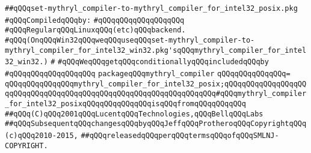 \label{src/lib/core/compiler/set-mythryl_compiler-to-mythryl_compiler_for_intel32_posix.pkg}
\verb|##qQQqset-mythryl_compiler-to-mythryl_compiler_for_intel32_posix.pkg|\newline
\newline
\verb|#qQQqCompiledqQQqby:|\newline
\verb|#qQQqqQQqqQQqqQQqqQQq|\newline
\newline
\verb|#qQQqRegularqQQqLinuxqQQq(etc)qQQqbackend.|\newline
\verb|#qQQq(OnqQQqWin32qQQqweqQQquseqQQqset-mythryl_compiler-to-mythryl_compiler_for_intel32_win32.pkg'sqQQqmythryl_compiler_for_intel32_win32.)|\newline
\verb|#|\newline
\verb|#qQQqWeqQQqgetqQQqconditionallyqQQqincludedqQQqby|\newline
\verb|#qQQqqQQqqQQqqQQqqQQq|\newline
\newline
\newline
\newline
\verb|packageqQQqmythryl_compiler|\newline
\verb|qQQqqQQqqQQqqQQq=|\newline
\verb|qQQqqQQqqQQqqQQqmythryl_compiler_for_intel32_posix;qQQqqQQqqQQqqQQqqQQqqQQqqQQqqQQqqQQqqQQqqQQqqQQqqQQqqQQqqQQqqQQqqQQq#qQQqmythryl_compiler_for_intel32_posixqQQqqQQqqQQqqQQqisqQQqfromqQQqqQQqqQQq|\newline
\newline
\newline
\verb|##qQQq(C)qQQq2001qQQqLucentqQQqTechnologies,qQQqBellqQQqLabs|\newline
\verb|##qQQqSubsequentqQQqchangesqQQqbyqQQqJeffqQQqProtheroqQQqCopyrightqQQq(c)qQQq2010-2015,|\newline
\verb|##qQQqreleasedqQQqperqQQqtermsqQQqofqQQqSMLNJ-COPYRIGHT.|\newline

